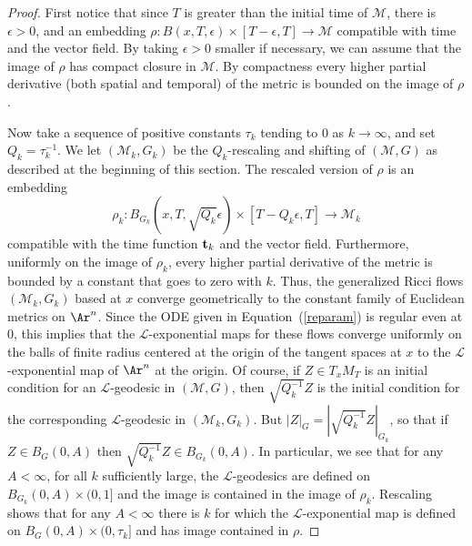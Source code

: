 \begin{proof}
\sketch
First notice that since $T$ is greater than the initial time of ${\mathcal M}$,
there is $\epsilon>0$, and an embedding $\rho\colon B(x,T,\epsilon)\times
[T-\epsilon,T]\to {\mathcal M}$ compatible with time  and the vector field. By
taking $\epsilon>0$ smaller if necessary, we can assume that the image of
$\rho$ has compact closure in ${\mathcal M}$. By compactness every higher
partial derivative (both spatial and temporal) of the metric is bounded on the
image of $\rho$.

Now take a sequence of positive constants $\tau_k$ tending to $0$ as
$k\rightarrow\infty$, and set $Q_k=\tau_k^{-1}$. We let $({\mathcal
M}_k,G_k)$ be the $Q_k$-rescaling and shifting of $({\mathcal M},G)$
as described at the beginning of this section. The rescaled version
of $\rho$ is an embedding
$$\rho_k\colon B_{G_k}(x,T,\sqrt{Q_k}\epsilon)\times [T-Q_k\epsilon,T]\to
{\mathcal M}_k$$ compatible with the time function ${\bf t}_k$ and the vector
field. Furthermore, uniformly on the image of $\rho_k$, every higher partial
derivative of the metric is bounded by a constant that goes to zero with $k$.
Thus, the generalized Ricci flows $({\mathcal M}_k,G_k)$ based at $x$ converge
geometrically to the constant family of Euclidean metrics on $\Ar^n$. Since the
ODE given in Equation~(\ref{reparam}) is regular even at $0$, this implies that
the ${\mathcal L}$-exponential maps for these flows converge uniformly on the
balls of finite radius centered at the origin of the tangent spaces at $x$ to
the ${\mathcal L}$-exponential map of $\Ar^n$ at the origin. Of course, if
$Z\in T_xM_T$ is an initial condition for an ${\mathcal L}$-geodesic in
$({\mathcal M},G)$, then $\sqrt{Q_k^{-1}}Z$ is the initial condition for the
corresponding ${\mathcal L}$-geodesic in $({\mathcal M}_k,G_k)$. But
$|Z|_G=|\sqrt{Q_k^{-1}}Z|_{G_k}$, so that if $Z\in B_G(0,A)$ then
$\sqrt{Q_k^{-1}}Z\in B_{G_k}(0,A)$.
 In particular, we see
that for any $A<\infty$, for all $k$ sufficiently large, the
${\mathcal L}$-geodesics are defined on $B_{G_k}(0,A)\times (0,1]$
and the image is contained in the image of $\rho_k$. Rescaling shows
that for any $A<\infty$  there is $k$ for which the ${\mathcal
L}$-exponential map is defined on $B_G(0,A)\times (0,\tau_k]$ and
has image contained in $\rho$.


\end{proof}
